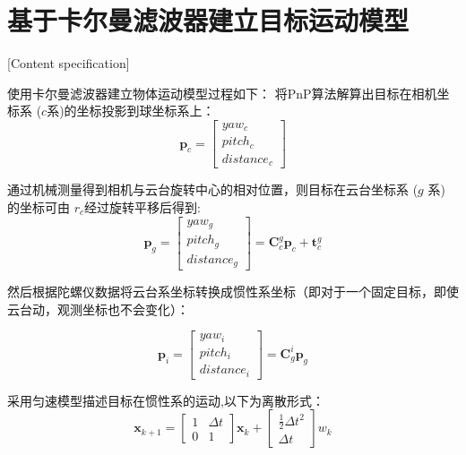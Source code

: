 \section{基于卡尔曼滤波器建立目标运动模型}[Content specification]

使用卡尔曼滤波器建立物体运动模型过程如下：
将PnP算法解算出目标在相机坐标系 ($c$系)的坐标投影到球坐标系上：
\begin{equation} \boldsymbol p_c=\left[\begin{array}{c} yaw_c\\ pitch_c \\ distance_c \end{array}\right] \end{equation}
\par 
通过机械测量得到相机与云台旋转中心的相对位置，则目标在云台坐标系 ($g$ 系) 的坐标可由 $r_c$经过旋转平移后得到:
\begin{equation} \boldsymbol p_g=\left[\begin{array}{c} yaw_g\\ pitch_g\\ distance_g \end{array}\right] =\boldsymbol C_{c}^{g}\boldsymbol p_c + \boldsymbol t_{c}^{g} \end{equation}
\par 
然后根据陀螺仪数据将云台系坐标转换成惯性系坐标（即对于一个固定目标，即使云台动，观测坐标也不会变化）：


\begin{equation} \boldsymbol p_i=\left[\begin{array}{c} yaw_i\\ pitch_i\\ distance_i \end{array}\right] =\boldsymbol C_{g}^{i}\boldsymbol p_g \end{equation}

\par
采用匀速模型描述目标在惯性系的运动,以下为离散形式：
\begin{equation} \boldsymbol x_{k+1} =\left[\begin{array}{cc} {1} & \Delta t  \\ 0 & {1}  \end{array}\right]\boldsymbol x_{k} + \left[\begin{array}{c} {\frac{1}{2}\Delta t^2} \\ {\Delta t}  \end{array}\right]w_k \end{equation}



